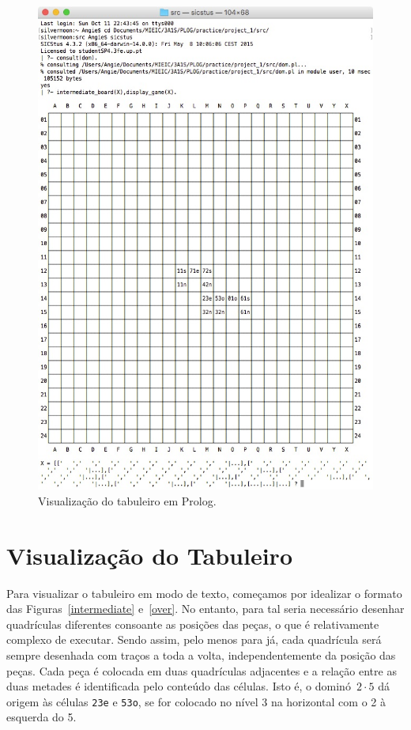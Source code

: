 \documentclass[a4paper]{article}
\begin{document}
\begin{figure}[htbp]
\begin{center}
\includegraphics[scale=0.7]{inter_output.jpg}
\caption{Visualização do tabuleiro em Prolog.}
\label{inter_output}
\end{center}
\end{figure}

\section{Visualização do Tabuleiro}

Para visualizar o tabuleiro em modo de texto, começamos por idealizar o formato das Figuras~\ref{intermediate} e~\ref{over}. No entanto, para tal seria necessário desenhar quadrículas diferentes consoante as posições das peças, o que é relativamente complexo de executar. Sendo assim, pelo menos para já, cada quadrícula será sempre desenhada com traços a toda a volta, independentemente da posição das peças. Cada peça é colocada em duas quadrículas adjacentes e a relação entre as duas metades é identificada pelo conteúdo das células. Isto é, o dominó~$2 \cdot 5$ dá origem às células \verb|23e| e \verb|53o|, se for colocado no nível 3 na horizontal com o 2 à esquerda do 5.
\end{document}
